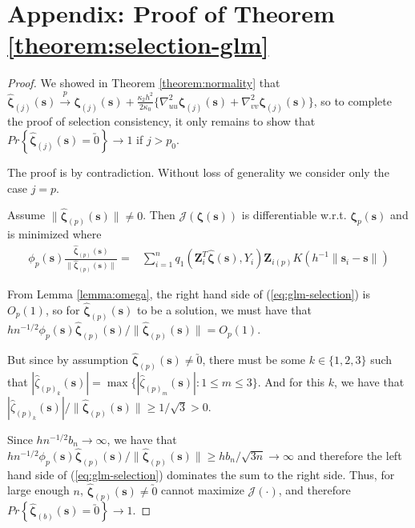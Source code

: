 \documentclass[authoryear,review, 12pt]{elsarticle}
\begin{document}
\section*{Appendix: Proof of Theorem \ref{theorem:selection-glm}}
\begin{proof}
We showed in Theorem \ref{theorem:normality} that $\hat{\bm{\zeta}}_{\left(j\right)}\left(\bm{s}\right)\xrightarrow{p}\bm{\zeta}_{\left(j\right)}\left(\bm{s}\right)+\frac{\kappa_{2}h^{2}}{2\kappa_{0}}\{\nabla_{uu}^{2}\bm{\zeta}_{\left(j\right)}\left(\bm{s}\right)+\nabla_{vv}^{2}\bm{\zeta}_{\left(j\right)}\left(\bm{s}\right)\}$,
so to complete the proof of selection consistency, it only remains
to show that $Pr\left\{ \hat{\bm{\zeta}}_{\left(j\right)}\left(\bm{s}\right)=\utilde{0}\right\} \to1$
if $j>p_{0}$.

The proof is by contradiction. Without loss of generality we consider
only the case $j=p$.

Assume $\|\hat{\bm{\zeta}}_{\left(p\right)}(\bm{s})\|\ne0$. Then
$\mathcal{J}\left(\bm{\zeta}\left(\bm{s}\right)\right)$ is differentiable
w.r.t. $\bm{\zeta}_{p}\left(\bm{s}\right)$ and is minimized where
\begin{align}
\phi_{p}(\bm{s})\frac{\hat{\bm{\zeta}}_{\left(p\right)}\left(\bm{s}\right)}{\|\hat{\bm{\zeta}}_{\left(p\right)}\left(\bm{s}\right)\|}= & \sum_{i=1}^{n}q_{1}\left(\bm{Z}_{i}^{T}\hat{\bm{\zeta}}\left(\bm{s}\right),Y_{i}\right)\bm{Z}_{i\left(p\right)}K\left(h^{-1}\|\bm{s}_{i}-\bm{s}\|\right)\label{eq:glm-selection}
\end{align}


From Lemma \ref{lemma:omega}, the right hand side of (\ref{eq:glm-selection})
is $O_{p}\left(1\right)$, so for $\hat{\bm{\zeta}}_{\left(p\right)}\left(\bm{s}\right)$
to be a solution, we must have that $hn^{-1/2}\phi_{p}\left(\bm{s}\right)\hat{\bm{\zeta}}_{\left(p\right)}\left(\bm{s}\right)/\|\hat{\bm{\zeta}}_{\left(p\right)}\left(\bm{s}\right)\|=O_{p}\left(1\right)$.

But since by assumption $\hat{\bm{\zeta}}_{\left(p\right)}\left(\bm{s}\right)\ne\utilde{0}$,
there must be some $k\in\{1,2,3\}$ such that $|\hat{\zeta}_{\left(p\right)_{k}}\left(\bm{s}\right)|=\max\{|\hat{\zeta}_{\left(p\right)_{m}}\left(\bm{s}\right)|:1\le m\le3\}$.
And for this $k$, we have that $|\hat{\zeta}_{\left(p\right)_{k}}\left(\bm{s}\right)|/\|\hat{\bm{\zeta}}_{\left(p\right)}\left(\bm{s}\right)\|\ge1/\sqrt{3}>0$.

Since $hn^{-1/2}b_{n}\to\infty$, we have that $hn^{-1/2}\phi_{p}\left(\bm{s}\right)\hat{\bm{\zeta}}_{\left(p\right)}\left(\bm{s}\right)/\|\hat{\bm{\zeta}}_{\left(p\right)}\left(\bm{s}\right)\|\ge hb_{n}/\sqrt{3n}\to\infty$
and therefore the left hand side of (\ref{eq:glm-selection}) dominates
the sum to the right side. Thus, for large enough $n$, $\hat{\bm{\zeta}}_{\left(p\right)}\left(\bm{s}\right)\ne\utilde{0}$
cannot maximize $\mathcal{J}\left(\cdot\right)$, and therefore $Pr\left\{ \hat{\bm{\zeta}}_{\left(b\right)}\left(\bm{s}\right)=\utilde{0}\right\} \to1$. 
\end{proof}
\end{document}
